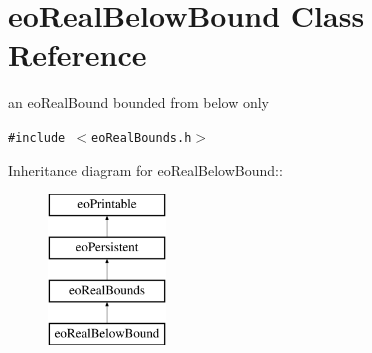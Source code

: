 \section{eo\-Real\-Below\-Bound Class Reference}
\label{classeo_real_below_bound}
an eo\-Real\-Bound bounded from below only  


{\tt \#include $<$eo\-Real\-Bounds.h$>$}

Inheritance diagram for eo\-Real\-Below\-Bound::\begin{figure}[H]
\begin{center}
\leavevmode
\includegraphics[height=4cm]{classeo_real_below_bound}
\end{center}
\end{figure}
